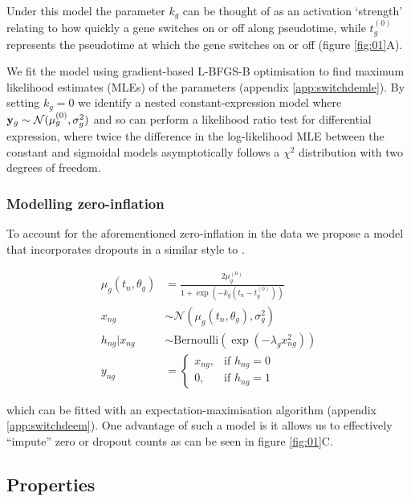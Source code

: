 Under this model the parameter $k_g$ can be thought of as an activation `strength' relating to how quickly a gene switches on or off along pseudotime, while $t^{(0)}_g$ represents the pseudotime at which the gene switches on or off (figure \ref{fig:01}A).

We fit the model using gradient-based L-BFGS-B optimisation to find maximum likelihood estimates (MLEs) of the parameters (appendix \ref{app:switchdemle}). By setting $k_g = 0$ we identify a nested constant-expression model where ${\bf y}_g \sim \mathcal{N}({\mu^{(0)}_g}, \sigma^2_g)$ and so can perform a likelihood ratio test for differential expression, where twice the difference in the log-likelihood MLE between the constant and sigmoidal models asymptotically follows a $\chi^2$ distribution with two degrees of freedom.

\subsubsection{Modelling zero-inflation}

To account for the aforementioned zero-inflation in the data we propose a model that incorporates dropouts in a similar style to \cite{pierson2015zifa}.

\newpage

\begin{equation}
\begin{aligned}
\mu_g(t_n, \theta_g) & = \frac{2 \mu^{(0)}_g}{1 + \exp\left(-k_g(t_n - t^{(0)}_g)\right)} \\
x_{ng} & \sim \mathcal{N}(\mu_g(t_n, \theta_g), \sigma_g^2) \\
h_{ng} | x_{ng} & \sim \mathrm{Bernoulli}(\exp(-\lambda_g x_{ng}^2)) \\
    y_{ng} &=
\begin{cases}
    x_{ng} ,& \text{if } h_{ng} = 0\\
    0,  & \text{if } h_{ng} = 1
\end{cases}
\end{aligned}
\end{equation}

which can be fitted with an expectation-maximisation algorithm (appendix \ref{app:switchdeem}). One advantage of such a model is it allows us to effectively ``impute'' zero or dropout counts as can be seen in figure \ref{fig:01}C.


\subsection{Properties}

